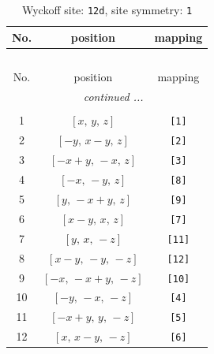 \documentclass[fleqn,8pt]{jsarticle}
\begin{document}
\renewcommand{\arraystretch}{1.2}
\begin{longtable}{ccc}
\caption{Wyckoff site: {\tt 12d}, site symmetry: {\tt 1}}
 \\
 \hline \hline
No. & position & mapping \\ \hline \endfirsthead

\multicolumn{2}{l}{\tablename\ \thetable{}} \\
 \hline \hline
No. & position & mapping \\ \hline \endhead

 \hline \hline
\multicolumn{2}{r}{\footnotesize\it continued ...} \\ \endfoot

 \hline \hline
\multicolumn{2}{r}{} \\ \endlastfoot

1 & $\left[ x,\, y,\, z \right]$ & {\tt [1]} \\ \hline
2 & $\left[ - y,\, x - y,\, z \right]$ & {\tt [2]} \\ \hline
3 & $\left[ - x + y,\, - x,\, z \right]$ & {\tt [3]} \\ \hline
4 & $\left[ - x,\, - y,\, z \right]$ & {\tt [8]} \\ \hline
5 & $\left[ y,\, - x + y,\, z \right]$ & {\tt [9]} \\ \hline
6 & $\left[ x - y,\, x,\, z \right]$ & {\tt [7]} \\ \hline
7 & $\left[ y,\, x,\, - z \right]$ & {\tt [11]} \\ \hline
8 & $\left[ x - y,\, - y,\, - z \right]$ & {\tt [12]} \\ \hline
9 & $\left[ - x,\, - x + y,\, - z \right]$ & {\tt [10]} \\ \hline
10 & $\left[ - y,\, - x,\, - z \right]$ & {\tt [4]} \\ \hline
11 & $\left[ - x + y,\, y,\, - z \right]$ & {\tt [5]} \\ \hline
12 & $\left[ x,\, x - y,\, - z \right]$ & {\tt [6]} \\
\end{longtable}
\end{document}
